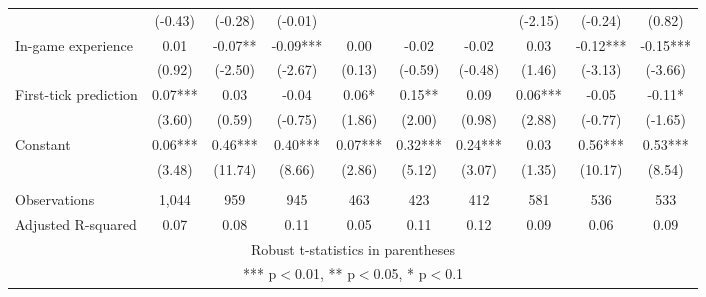 \documentclass[]{article}
\begin{document}
\begin{tabular}{lccccccccc}
 & (-0.43) & (-0.28) & (-0.01) &  &  &  & (-2.15) & (-0.24) & (0.82) \\
In-game experience & 0.01 & -0.07** & -0.09*** & 0.00 & -0.02 & -0.02 & 0.03 & -0.12*** & -0.15*** \\
 & (0.92) & (-2.50) & (-2.67) & (0.13) & (-0.59) & (-0.48) & (1.46) & (-3.13) & (-3.66) \\
First-tick prediction & 0.07*** & 0.03 & -0.04 & 0.06* & 0.15** & 0.09 & 0.06*** & -0.05 & -0.11* \\
 & (3.60) & (0.59) & (-0.75) & (1.86) & (2.00) & (0.98) & (2.88) & (-0.77) & (-1.65) \\
Constant & 0.06*** & 0.46*** & 0.40*** & 0.07*** & 0.32*** & 0.24*** & 0.03 & 0.56*** & 0.53*** \\
 & (3.48) & (11.74) & (8.66) & (2.86) & (5.12) & (3.07) & (1.35) & (10.17) & (8.54) \\
 &  &  &  &  &  &  &  &  &  \\
Observations & 1,044 & 959 & 945 & 463 & 423 & 412 & 581 & 536 & 533 \\
 Adjusted R-squared & 0.07 & 0.08 & 0.11 & 0.05 & 0.11 & 0.12 & 0.09 & 0.06 & 0.09 \\ \hline
\multicolumn{10}{c}{ Robust t-statistics in parentheses} \\
\multicolumn{10}{c}{ *** p$<$0.01, ** p$<$0.05, * p$<$0.1} \\
\end{tabular}
\end{document}
